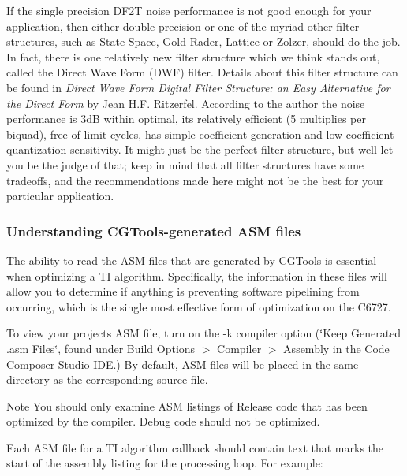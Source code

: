 If the single precision D\+F2\+T noise performance is not good enough for your application, then either double precision or one of the myriad other filter structures, such as State Space, Gold-\/\+Rader, Lattice or Zolzer, should do the job. In fact, there is one relatively new filter structure which we think stands out, called the Direct Wave Form (D\+W\+F) filter. Details about this filter structure can be found in {\itshape  Direct Wave Form Digital Filter Structure\+: an Easy Alternative for the Direct Form} by Jean H.\+F. Ritzerfel. According to the author the noise performance is 3d\+B within optimal, it\textquotesingle{}s relatively efficient (5 multiplies per biquad), free of limit cycles, has simple coefficient generation and low coefficient quantization sensitivity. It might just be the perfect filter structure, but we\textquotesingle{}ll let you be the judge of that; keep in mind that all filter structures have some tradeoffs, and the recommendations made here might not be the best for your particular application.

\hypertarget{a00362_subsection__understanding_cgtoolsgenerated_asm_files}{}\subsubsection{Understanding C\+G\+Tools-\/generated A\+S\+M files}\label{a00362_subsection__understanding_cgtoolsgenerated_asm_files}
 The ability to read the A\+S\+M files that are generated by C\+G\+Tools is essential when optimizing a T\+I algorithm. Specifically, the information in these files will allow you to determine if anything is preventing software pipelining from occurring, which is the single most effective form of optimization on the C6727.

To view your project\textquotesingle{}s A\+S\+M file, turn on the {\ttfamily -\/k} compiler option (\char`\"{}\+Keep Generated .\+asm Files\char`\"{}, found under Build Options $>$ Compiler $>$ Assembly in the Code Composer Studio I\+D\+E.) By default, A\+S\+M files will be placed in the same directory as the corresponding source file.

\begin{DoxyNote}{Note}
You should only examine A\+S\+M listings of Release code that has been optimized by the compiler. Debug code should not be optimized.
\end{DoxyNote}
Each A\+S\+M file for a T\+I algorithm callback should contain text that marks the start of the assembly listing for the processing loop. For example\+:


